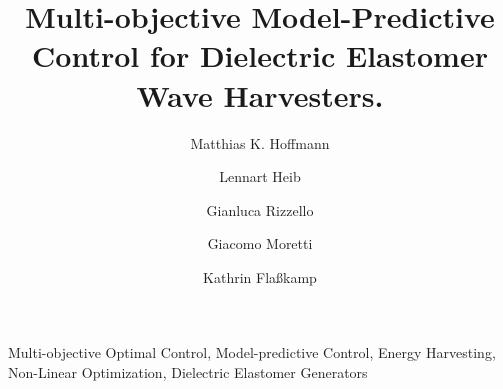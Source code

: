 \documentclass[algo2e]{ifacconf}
\begin{document}
	\begin{frontmatter}
		
		\title{Multi-objective Model-Predictive Control for Dielectric Elastomer Wave Harvesters.} 
		
		\author[First]{Matthias K. Hoffmann} 
		\author[First]{Lennart Heib} 
		\author[Second]{Gianluca Rizzello}
		\author[Third]{Giacomo Moretti}
		\author[First]{Kathrin Flaßkamp} 
		
		\address[First]{Systems Modeling and Simulation,\linebreak (e-mail:~\{{matthias.hoffmann, kathrin.flasskamp\}@uni-saarland.de, lennartheib@gmail.com})}
		\address[Second]{Intelligent Material Systems Lab,\linebreak	(e-mail:~gianluca.rizzello@imsl.uni-saarland.de)}
		\address[Third]{Università degli Studi di Trento, (e-mail:~giacomo.moretti@unitn.it)
			\linebreak
			$^{*}$ and $^{**}$ from Saarland University, Saarbrücken, Germany.}
		
		\begin{abstract}                %
			
		\end{abstract}
		
		\begin{keyword}
			Multi-objective Optimal Control, Model-predictive Control, Energy Harvesting, Non-Linear Optimization, Dielectric Elastomer Generators
		\end{keyword}
		
	\end{frontmatter}
	
	
	
	
	
	
	
	
	
\end{document}

